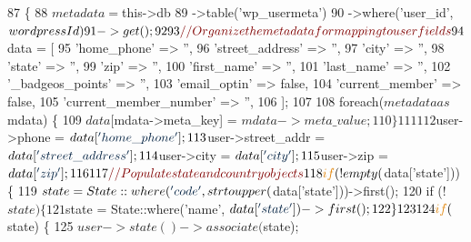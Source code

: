 \begin{DoxyCode}
87     \{
88         $metadata = $this->db
89             ->table(\textcolor{stringliteral}{'wp\_usermeta'})
90             ->where(\textcolor{stringliteral}{'user\_id'}, $wordpressId)
91             ->get();
92 
93         \textcolor{comment}{// Organize the metadata for mapping to user fields}
94         $data = [
95             \textcolor{stringliteral}{'home\_phone'}            => \textcolor{stringliteral}{''},
96             \textcolor{stringliteral}{'street\_address'}        => \textcolor{stringliteral}{''},
97             \textcolor{stringliteral}{'city'}                  => \textcolor{stringliteral}{''},
98             \textcolor{stringliteral}{'state'}                 => \textcolor{stringliteral}{''},
99             \textcolor{stringliteral}{'zip'}                   => \textcolor{stringliteral}{''},
100             \textcolor{stringliteral}{'first\_name'}            => \textcolor{stringliteral}{''},
101             \textcolor{stringliteral}{'last\_name'}             => \textcolor{stringliteral}{''},
102             \textcolor{stringliteral}{'\_badgeos\_points'}       => \textcolor{stringliteral}{''},
103             \textcolor{stringliteral}{'email\_optin'}           => \textcolor{keyword}{false},
104             \textcolor{stringliteral}{'current\_member'}        => \textcolor{keyword}{false},
105             \textcolor{stringliteral}{'current\_member\_number'} => \textcolor{stringliteral}{''},
106         ];
107 
108         \textcolor{keywordflow}{foreach}($metadata as $mdata) \{
109             $data[$mdata->meta\_key] = $mdata->meta\_value;
110         \}
111 
112         $user->phone            = $data[\textcolor{stringliteral}{'home\_phone'}];
113         $user->street\_addr      = $data[\textcolor{stringliteral}{'street\_address'}];
114         $user->city             = $data[\textcolor{stringliteral}{'city'}];
115         $user->zip              = $data[\textcolor{stringliteral}{'zip'}];
116 
117         \textcolor{comment}{// Populate state and country objects}
118         \textcolor{keywordflow}{if} (!empty($data[\textcolor{stringliteral}{'state'}])) \{
119             $state = State::where(\textcolor{stringliteral}{'code'}, strtoupper($data[\textcolor{stringliteral}{'state'}]))->first();
120             \textcolor{keywordflow}{if} (!$state) \{
121                 $state = State::where(\textcolor{stringliteral}{'name'}, $data[\textcolor{stringliteral}{'state'}])->first();
122             \}
123 
124             \textcolor{keywordflow}{if} ($state) \{
125                 $user->state()->associate($state);

\end{DoxyCode}
